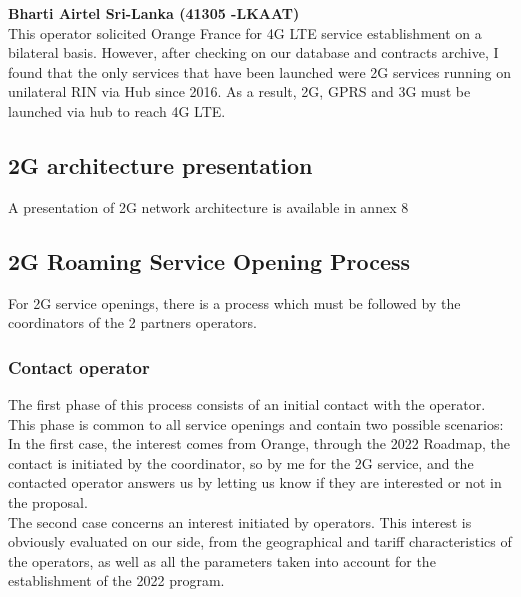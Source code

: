 {\large \textbf{Bharti Airtel Sri-Lanka (41305 -LKAAT)}}\\

This operator solicited Orange France for \acs{4G} \acs{LTE} service establishment on a bilateral basis. However, after checking on our database and contracts archive, I found that the only services that have been launched were \acs{2G} services running on unilateral \acs{RIN} via Hub since 2016. As a result, \acs{2G}, \acs{GPRS} and \acs{3G} must be launched via hub to reach \acs{4G} \acs{LTE}.\\

\subsection{\acs{2G} architecture presentation}
\-\hspace{0.5cm} A presentation of \acs{2G} network architecture is available in annex 8 \cite{annexes}\\

\subsection{\acs{2G} Roaming Service Opening Process}
\-\hspace{0.5cm} For \acs{2G} service openings, there is a process which must be followed by the coordinators of the 2 partners operators.\\

\subsubsection{Contact operator}
\-\hspace{0.5cm} The first phase of this process consists of an initial contact with the operator. This phase is common to all service openings and contain two possible scenarios:\\

In the first case, the interest comes from Orange, through the 2022 Roadmap, the contact is initiated by the coordinator, so by me for the \acs{2G} service, and the contacted operator answers us by letting us know if they are interested or not in the proposal.\\

The second case concerns an interest initiated by operators. This interest is obviously evaluated on our side, from the geographical and tariff characteristics of the operators, as well as all the parameters taken into account for the establishment of the 2022 program.\\

